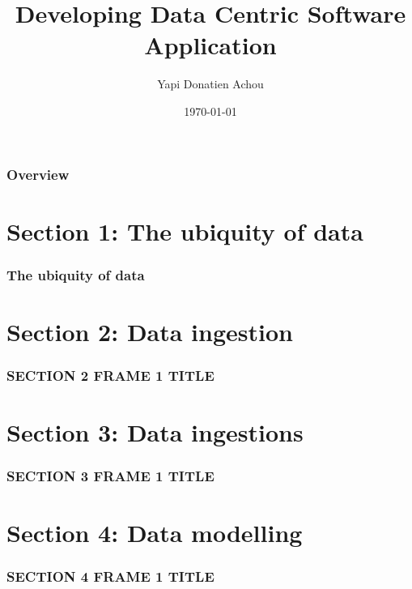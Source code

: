 \documentclass{beamer}
\title[Data management course, USN]{Developing Data Centric Software Application} %
\author{Yapi Donatien Achou} %
\institute[Semcon] %
{
Semcon \\ %
\medskip
\textit{yapi-donatien.achou@semcon.com} %
}
\date{\today} %
\begin{document}
\begin{frame}
\titlepage %
\end{frame}

\begin{frame}
\frametitle{Overview} %
\tableofcontents %
\end{frame}

\section{Section 1: The ubiquity of data} 
\begin{frame}
\frametitle{The ubiquity of data}
\end{frame}




\section{Section 2: Data ingestion}
\begin{frame}
\frametitle{SECTION 2 FRAME 1 TITLE}
\end{frame}




\section{Section 3: Data ingestions}
\begin{frame}
\frametitle{SECTION 3 FRAME 1 TITLE}
\end{frame}




\section{Section 4: Data modelling}
\begin{frame}
\frametitle{SECTION 4 FRAME 1 TITLE}
\end{frame}
\end{document}

